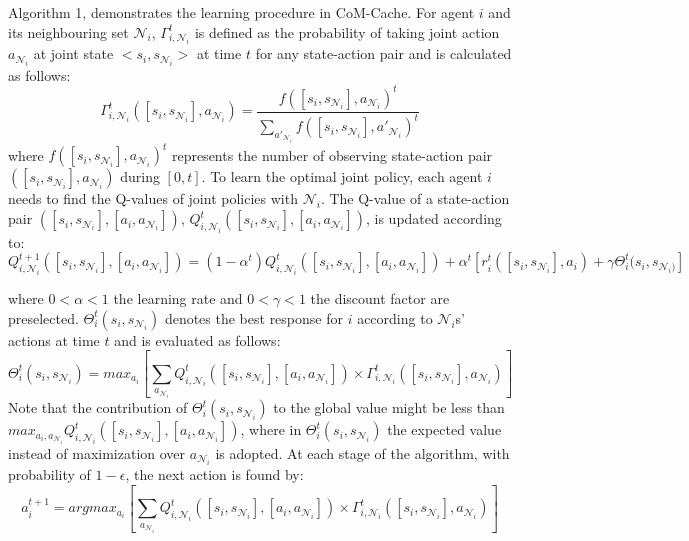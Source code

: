 \documentclass[journal,onecolumn]{IEEEtran}
\begin{document}
Algorithm 1, demonstrates the learning procedure in CoM-Cache.
For agent $i$ and its neighbouring set $\mathcal{N}_i$, $\Gamma_{i,\mathcal{N}_i}^t$ is defined as the probability of taking joint action $a_{\mathcal{N}_i}$ at joint state $<s_i,s_{\mathcal{N}_i}>$ at time $t$ for any state-action pair and is calculated as follows:  
\begin{equation}
\label{pi}
\Gamma_{i,\mathcal{N}_i}^t ([s_i,s_{\mathcal{N}_i}],a_{\mathcal{N}_i}) = \frac{f([s_i,s_{\mathcal{N}_i}],a_{\mathcal{N}_i})^t}{\sum_{a'_{\mathcal{N}_i}}f([s_i,s_{\mathcal{N}_i}],a'_{\mathcal{N}_i})^t}
\end{equation}
where $f([s_i,s_{\mathcal{N}_i}],a_{\mathcal{N}_i})^t$ represents the number of observing state-action pair $([s_i,s_{\mathcal{N}_i}],a_{\mathcal{N}_i})$ during $[0,t]$. To learn the optimal joint policy, each agent $i$ needs to find the Q-values of joint policies with $\mathcal{N}_i$. The Q-value of a state-action pair $([s_i,s_{\mathcal{N}_i}],[a_i,a_{\mathcal{N}_i}])$, $Q_{i,\mathcal{N}_i}^t ([s_i,s_{\mathcal{N}_i}],[a_i,a_{\mathcal{N}_i}])$, is updated according to:
\begin{equation}
 Q_{i,\mathcal{N}_i}^{t+1} ([s_i,s_{\mathcal{N}_i}],[a_i,a_{\mathcal{N}_i}]) = (1-\alpha^t) Q_{i,\mathcal{N}_i}^{t} ([s_i,s_{\mathcal{N}_i}],[a_i,a_{\mathcal{N}_i}])+ \alpha^t[r_i^t([s_i,s_{\mathcal{N}_i}],a_i) + \gamma \Theta_i^t(s_i,s_{\mathcal{N}_i)}]
\label{update-rule}
\end{equation}

where $0 < \alpha < 1$ the learning rate and $0 < \gamma < 1$ the discount factor are preselected. $\Theta_i^t(s_i,s_{\mathcal{N}_i})$ denotes the best response for $i$ according to $\mathcal{N}_i$s' actions at time $t$ and is evaluated as follows:
\begin{equation}
\Theta_i^t(s_i,s_{\mathcal{N}_i}) = max_{a_i}[\sum_{a_{\mathcal{N}_i}}Q_{i,\mathcal{N}_i}^t ([s_i,s_{\mathcal{N}_i}], [a_i, a_{\mathcal{N}_i}]) \times \Gamma_{i,\mathcal{N}_i}^t ([s_i,s_{\mathcal{N}_i}],a_{\mathcal{N}_i})]
\label{best-response}
\end{equation}
Note that the contribution of $\Theta_i^t(s_i,s_{\mathcal{N}_i})$ to the global value might be less than $max_{a_i,a_{\mathcal{N}_i}}Q_{i,\mathcal{N}_i}^t ([s_i,s_{\mathcal{N}_i}], [a_i, a_{\mathcal{N}_i}])$, where in $\Theta_i^t(s_i,s_{\mathcal{N}_i})$ the expected value instead of maximization over $a_{\mathcal{N}_i}$ is adopted.
At each stage of the algorithm, with probability of $1-\epsilon$, the next action is found by:
\begin{equation}
a_i^{t+1} = argmax_{a_i}[\sum_{a_{\mathcal{N}_i}}Q_{i,\mathcal{N}_i}^t ([s_i,s_{\mathcal{N}_i}], [a_i, a_{\mathcal{N}_i}])\times \Gamma_{i,\mathcal{N}_i}^t ([s_i,s_{\mathcal{N}_i}],a_{\mathcal{N}_i})]
\label{decision-rule}
\end{equation}
\end{document}

